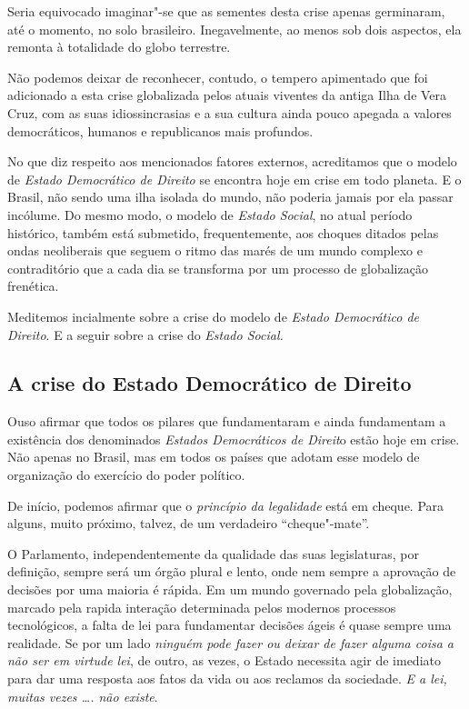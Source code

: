 Seria equivocado imaginar"-se que as sementes desta crise apenas
germinaram, até o momento, no solo brasileiro. Inegavelmente, ao menos
sob dois aspectos, ela remonta à totalidade do globo terrestre.

Não podemos deixar de reconhecer, contudo, o tempero apimentado que foi
adicionado a esta crise globalizada pelos atuais viventes da antiga Ilha
de Vera Cruz, com as suas idiossincrasias e a sua cultura ainda pouco
apegada a valores democráticos, humanos e republicanos mais profundos.

No que diz respeito aos mencionados fatores externos, acreditamos que o
modelo de \emph{Estado Democrático de Direito} se encontra hoje em crise
em todo planeta. E o Brasil, não sendo uma ilha isolada do mundo, não
poderia jamais por ela passar incólume. Do mesmo modo, o modelo de
\emph{Estado Social}, no atual período histórico, também está submetido,
frequentemente, aos choques ditados pelas ondas neoliberais que seguem o
ritmo das marés de um mundo complexo e contraditório que a cada dia se
transforma por um processo de globalização frenética.

Meditemos incialmente sobre a crise do modelo de \emph{Estado
Democrático de Direito}. E a seguir sobre a crise do \emph{Estado
Social.}

\subsection{A crise do Estado Democrático de Direito}

Ouso afirmar que todos os pilares que fundamentaram e ainda fundamentam
a existência dos denominados \emph{Estados Democráticos de Direit}o
estão hoje em crise. Não apenas no Brasil, mas em todos os países que
adotam esse modelo de organização do exercício do poder político.

De início, podemos afirmar que o \emph{princípio da legalidade} está em
cheque. Para alguns, muito próximo, talvez, de um verdadeiro
``cheque"-mate''.

O Parlamento, independentemente da qualidade das suas legislaturas, por
definição, sempre será um órgão plural e lento, onde nem sempre a
aprovação de decisões por uma maioria é rápida. Em um mundo governado
pela globalização, marcado pela rapida interação determinada pelos
modernos processos tecnológicos, a falta de lei para fundamentar
decisões ágeis é quase sempre uma realidade. Se por um lado
\emph{ninguém pode fazer ou deixar de fazer alguma coisa a não ser em
virtude lei}, de outro, as vezes, o Estado necessita agir de imediato
para dar uma resposta aos fatos da vida ou aos reclamos da sociedade.
\emph{E a lei, muitas vezes \ldots{}. não existe}.


